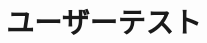 \documentclass[dvipdfmx]{jsarticle}
\newcommand{\1}{\mbox{1}\hspace{-0.25em}\mbox{l}}
\begin{document}
\section{ユーザーテスト}


\section{}
\end{document}
